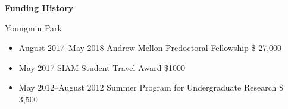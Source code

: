 \documentclass[a4paper,11pt]{article}
\begin{document}
\begin{center}
\Large \textbf{Funding History}

\Large Youngmin Park
\end{center}

\begin{itemize}
 \item August 2017--May 2018 Andrew Mellon Predoctoral Fellowship \$ 27,000
 \item May 2017 SIAM Student Travel Award \$1000
 \item May 2012--August 2012 Summer Program for Undergraduate Research \$ 3,500
\end{itemize}
\end{document}
